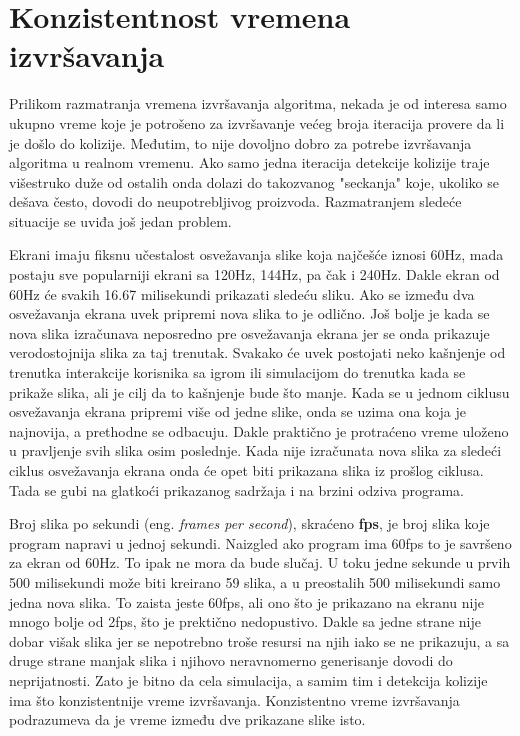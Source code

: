 \documentclass[12pt,oneside]{memoir}
\begin{document}
\section{Konzistentnost vremena izvršavanja}

Prilikom razmatranja vremena izvršavanja algoritma, nekada je od interesa 
samo ukupno vreme koje je potrošeno za izvršavanje većeg broja iteracija provere da li je došlo do kolizije. 
Međutim, to nije dovoljno dobro za potrebe izvršavanja algoritma u realnom vremenu.
Ako samo jedna iteracija 
detekcije kolizije traje višestruko duže od ostalih onda dolazi do takozvanog "seckanja"
koje, ukoliko se dešava često, dovodi do neupotrebljivog proizvoda.
Razmatranjem sledeće situacije se uviđa još jedan problem.

Ekrani imaju fiksnu učestalost osvežavanja slike koja najčešće iznosi 60Hz, mada postaju sve popularniji
ekrani sa 120Hz, 144Hz, pa čak i 240Hz. Dakle ekran od 60Hz će svakih 16.67 milisekundi prikazati sledeću sliku. 
Ako se između dva osvežavanja ekrana uvek pripremi nova slika to je odlično. 
Još bolje je kada se nova slika izračunava neposredno pre osvežavanja ekrana jer se onda 
prikazuje verodostojnija slika za taj trenutak. 
Svakako će uvek postojati neko kašnjenje od trenutka interakcije korisnika sa igrom ili simulacijom do
trenutka kada se prikaže slika, ali je cilj da to kašnjenje bude što manje. 
Kada se u jednom ciklusu osvežavanja ekrana pripremi više od jedne slike, onda se uzima ona koja je najnovija,
a prethodne se odbacuju. 
Dakle praktično je protraćeno vreme uloženo u pravljenje svih slika osim poslednje.
Kada nije izračunata nova slika za sledeći ciklus osvežavanja ekrana onda će opet biti prikazana slika
iz prošlog ciklusa. Tada se gubi na glatkoći prikazanog sadržaja i na brzini odziva programa. 

Broj slika po sekundi (eng. {\em frames per second}), skraćeno \textbf{fps}, je broj slika koje program napravi u jednoj sekundi.
Naizgled ako program ima 60fps to je savršeno za ekran od 60Hz. To ipak ne mora da bude slučaj.
U toku jedne sekunde u prvih 500 milisekundi može biti kreirano 59 slika, a u preostalih 500 milisekundi samo jedna nova slika. 
To zaista jeste 60fps, ali ono što je prikazano na ekranu nije mnogo bolje od 2fps, 
što je prektično nedopustivo. 
Dakle sa jedne strane nije dobar višak slika jer se nepotrebno troše resursi na njih iako se ne prikazuju, 
a sa druge strane manjak slika i njihovo neravnomerno generisanje dovodi do neprijatnosti.
Zato je bitno da cela simulacija, a samim tim i detekcija kolizije ima što konzistentnije vreme izvršavanja.
Konzistentno vreme izvršavanja podrazumeva da je vreme između dve prikazane slike isto.
\end{document}
